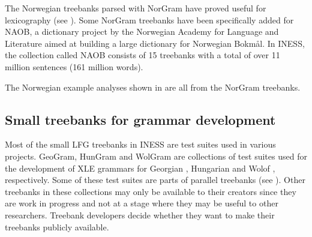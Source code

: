 \documentclass[output=paper,hidelinks]{langscibook}
\begin{document}
The Norwegian treebanks parsed with NorGram have proved useful for lexicography (see ). 
Some NorGram treebanks have been specifically added for NAOB, a dictionary project by the Norwegian Academy for Language and Literature aimed at building a large dictionary for Norwegian Bokmål.
In INESS, the collection called NAOB consists of 15 treebanks with a total of over 11 million sentences (161 million words). %

The Norwegian example analyses shown in  are all from the NorGram treebanks.

\subsection{Small treebanks for grammar development}\label{small}

Most of the small LFG treebanks in INESS are test suites used in various projects.
GeoGram, HunGram and WolGram are collections of test suites used for the development of XLE grammars for Georgian \citep{meurer09}, Hungarian \citep{Laczko13,Laczko14} and Wolof \citep{Dione:Disambiguation,Dione19Clause}, respectively.
Some of these test suites are parts of parallel treebanks (see ).
Other treebanks in these collections may only be available to their creators since they are work in progress and not at a stage where they may be useful to other researchers.
Treebank developers decide whether they want to make their treebanks publicly available.

%
%






\end{document}
